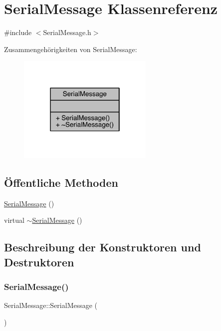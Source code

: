 \hypertarget{class_serial_message}{}\section{Serial\+Message Klassenreferenz}
\label{class_serial_message}


{\ttfamily \#include $<$Serial\+Message.\+h$>$}



Zusammengehörigkeiten von Serial\+Message\+:
\nopagebreak
\begin{figure}[H]
\begin{center}
\leavevmode
\includegraphics[width=183pt]{class_serial_message__coll__graph}
\end{center}
\end{figure}
\subsection*{Öffentliche Methoden}
\begin{DoxyCompactItemize}
\item 
\hyperlink{class_serial_message_aef84d2a1b8928bf39c0f4e59bdf7e36f}{Serial\+Message} ()
\item 
virtual \hyperlink{class_serial_message_a9bcc2b473a850ca82bf139a9fee6debb}{$\sim$\+Serial\+Message} ()
\end{DoxyCompactItemize}


\subsection{Beschreibung der Konstruktoren und Destruktoren}
\hypertarget{class_serial_message_aef84d2a1b8928bf39c0f4e59bdf7e36f}{}\label{class_serial_message_aef84d2a1b8928bf39c0f4e59bdf7e36f} 
\subsubsection{\texorpdfstring{Serial\+Message()}{SerialMessage()}}
{\footnotesize\ttfamily Serial\+Message\+::\+Serial\+Message (\begin{DoxyParamCaption}{ }\end{DoxyParamCaption})}


